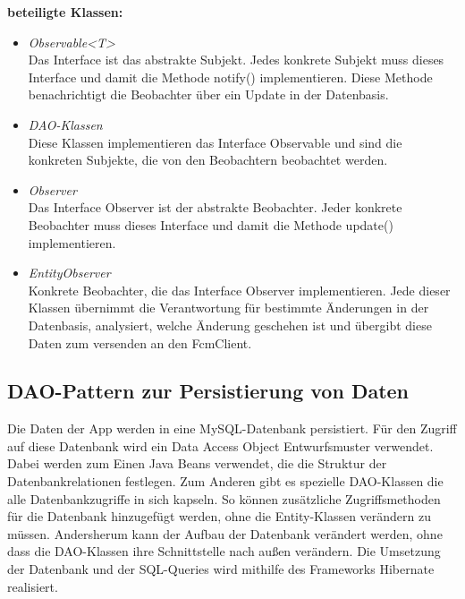 \documentclass[11pt,a4paper]{article}
\begin{document}
\textbf{beteiligte Klassen:}
\begin{itemize}
	\item \textit{Observable<T>}\\ Das Interface ist das abstrakte Subjekt. Jedes konkrete Subjekt muss dieses Interface und damit die Methode notify() implementieren. Diese Methode benachrichtigt die Beobachter über ein Update in der Datenbasis.
	\item \textit{DAO-Klassen}\\ Diese Klassen implementieren das Interface Observable und sind die konkreten Subjekte, die von den Beobachtern beobachtet werden.
	\item \textit{Observer}\\ Das Interface Observer ist der abstrakte Beobachter. Jeder konkrete Beobachter muss dieses Interface und damit die Methode update() implementieren.
	\item \textit{EntityObserver}\\Konkrete Beobachter, die das Interface Observer implementieren. Jede dieser Klassen übernimmt die Verantwortung für bestimmte Änderungen in der Datenbasis, analysiert, welche Änderung geschehen ist und übergibt diese Daten zum versenden an den FcmClient.
\end{itemize}

\subsection{DAO-Pattern zur Persistierung von Daten}
Die Daten der App werden in eine MySQL-Datenbank persistiert. Für den Zugriff auf diese Datenbank wird ein Data Access Object Entwurfsmuster verwendet. Dabei werden zum Einen Java Beans verwendet, die die Struktur der Datenbankrelationen festlegen. Zum Anderen gibt es spezielle DAO-Klassen die alle Datenbankzugriffe in sich kapseln. So können zusätzliche Zugriffsmethoden für die Datenbank hinzugefügt werden, ohne die Entity-Klassen verändern zu müssen. Andersherum kann der Aufbau der Datenbank verändert werden, ohne dass die DAO-Klassen ihre Schnittstelle nach außen verändern.
Die Umsetzung der Datenbank und der SQL-Queries wird mithilfe des Frameworks Hibernate realisiert.\\
\end{document}
